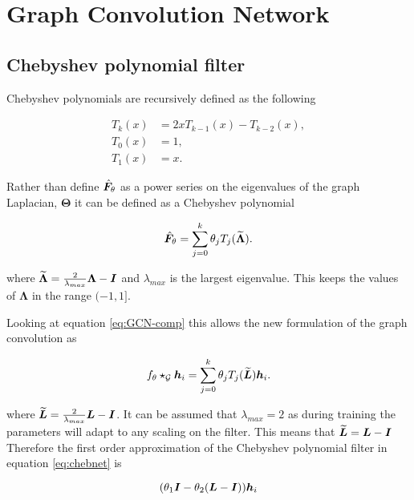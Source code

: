 \chapter{Graph Convolution Network}

\section{Chebyshev polynomial filter}
\label{app:chebyshev}

Chebyshev polynomials are recursively defined as the following

\begin{align}
    T_k(x) &= 2xT_{k-1}(x) - T_{k-2}(x), \\
    T_0(x) &= 1, \\
    T_1(x) &= x.
\end{align}

Rather than define $\hat{{\bm{F}}}_\theta$ as a power series on the eigenvalues of the graph Laplacian, $\bm{\Theta}$ it can be defined as a Chebyshev polynomial

\begin{equation}
    \hat{{\bm{F}}}_\theta = \sum_{j=0}^k\theta_jT_j(\widetilde{\bm{\Lambda}}).
\end{equation}

where $\widetilde{\bm{\Lambda}} = \frac2{\lambda_{max}}\bm{\Lambda} - {\bm{I}}$ and $\lambda_{max}$ is the largest eigenvalue. This keeps the values of $\bm{\Lambda}$ in the range $(-1, 1]$.

Looking at equation \ref{eq:GCN-comp} this allows the new formulation of the graph convolution as 

\begin{equation}
    \label{eq:chebnet}
    f_\theta \star_{\mathcal{G}} {\bm{h}}_i = \sum_{j=0}^k \theta_jT_j(\widetilde{{\bm{L}}}){\bm{h}}_i.
\end{equation}

where $\widetilde{{\bm{L}}} = \frac2{\lambda_{max}}{\bm{L}} - {\bm{I}}$. It can be assumed that $\lambda_{max} = 2$ as during training the parameters will adapt to any scaling on the filter. This means that $\widetilde{{\bm{L}}} = {\bm{L}} - {\bm{I}}$ Therefore the first order approximation of the Chebyshev polynomial filter in equation \ref{eq:chebnet} is 

\begin{equation}
    (\theta_1{\bm{I}} - \theta_2({\bm{L}} - {\bm{I}})){\bm{h}}_i
\end{equation}

%

